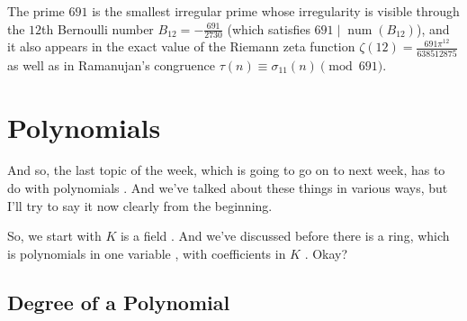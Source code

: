 \begin{aiNote}
The prime $691$ is the smallest irregular prime whose irregularity is visible through the $12$th Bernoulli number $B_{12} = -\frac{691}{2730}$ (which satisfies $691 \mid \operatorname{num}(B_{12})$), and it also appears in the exact value of the Riemann zeta function $\zeta(12) = \frac{691 \pi^{12}}{638512875}$ as well as in Ramanujan's congruence $\tau(n) \equiv \sigma_{11}(n) \pmod{691}$.
\end{aiNote}

\section{Polynomials}

\begin{speech}[00:22:26 - 00:23:20]
And so, the last topic of the week, which is going to go on to next week, has to do with polynomials . And we've talked about these things in various ways, but I'll try to say it now clearly from the beginning.

So, we start with $K$ is a field . And we've discussed before there is a ring, which is polynomials in one variable , with coefficients in $K$ . Okay?
\end{speech}

\begin{content}
\end{content}

\subsection{Degree of a Polynomial}

